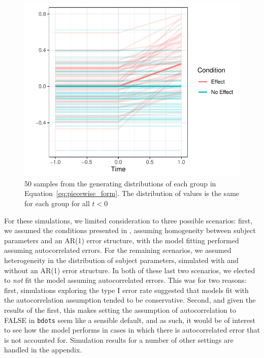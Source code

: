 \documentclass{article}
\newcommand{\xt}{\texttt}
\begin{document}
\begin{figure}[H]
    \centering
    \includegraphics{piecewise_distribution.pdf}
    \caption{ 50 samples from the generating distributions of each group in Equation~\ref{eq:piecewise_form}. The distribution of values is the same for each group for all $t < 0$}
\label{fig:distribution_piece}
\end{figure}




For these simulations, we limited consideration to three possible scenarios: first, we assumed the conditions presented in \citet{oleson2017detecting}, assuming homogeneity between subject parameters and an AR(1) error structure, with the model fitting performed assuming autocorrelated errors. For the remaining scenarios, we assumed heterogeneity in the distribution of subject parameters, simulated with and without an AR(1) error structure. In both of these last two scenarios, we elected to \textit{not} fit the model assuming autocorrelated errors. This was for two reasons: first, simulations exploring the type I error rate suggested that models fit with the autocorrelation assumption tended to be conservative. Second, and given the results of the first, this makes setting the assumption of autocorrelation to FALSE in \xt{bdots} seem like a sensible default, and as such, it would be of interest to see how the model performs in cases in which there is autocorrelated error that is not accounted for. Simulation results for a number of other settings are handled in the appendix. 
\end{document}
